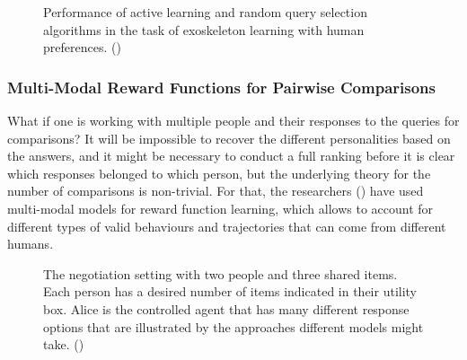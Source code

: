 \documentclass[
  letterpaper,
  numbers=noenddot,
  DIV=11]{scrreprt}
\theoremstyle{definition}
\theoremstyle{plain}
\theoremstyle{plain}
\theoremstyle{remark}
\begin{document}
\begin{figure}


\caption{\label{fig-robotics}Performance of active learning and random
query selection algorithms in the task of exoskeleton learning with
human preferences. ()}

\end{figure}%

\subsubsection*{Multi-Modal Reward Functions for Pairwise
Comparisons}\label{multi-modal-reward-functions-for-pairwise-comparisons}

What if one is working with multiple people and their responses to the
queries for comparisons? It will be impossible to recover the different
personalities based on the answers, and it might be necessary to conduct
a full ranking before it is clear which responses belonged to which
person, but the underlying theory for the number of comparisons is
non-trivial. For that, the researchers
() have used
multi-modal models for reward function learning, which allows to account
for different types of valid behaviours and trajectories that can come
from different humans.

\begin{figure}


\caption{\label{fig-negotiation}The negotiation setting with two people
and three shared items. Each person has a desired number of items
indicated in their utility box. Alice is the controlled agent that has
many different response options that are illustrated by the approaches
different models might take. ()}

\end{figure}%
\end{document}
